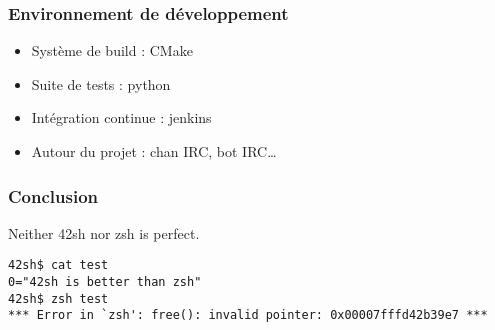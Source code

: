 \documentclass{beamer}
\begin{document}
\begin{frame}
    \frametitle{Environnement de développement}
    \begin{itemize}
        \item Système de build : CMake
        \item Suite de tests : python
        \item Intégration continue : jenkins
        \item Autour du projet : chan IRC, bot IRC\dots
    \end{itemize}
\end{frame}

\begin{frame} [fragile]
    \frametitle{Conclusion}
    Neither 42sh nor zsh is perfect.
\begin{verbatim}
42sh$ cat test
0="42sh is better than zsh"
42sh$ zsh test
*** Error in `zsh': free(): invalid pointer: 0x00007fffd42b39e7 ***
\end{verbatim}
\end{frame}
\end{document}
